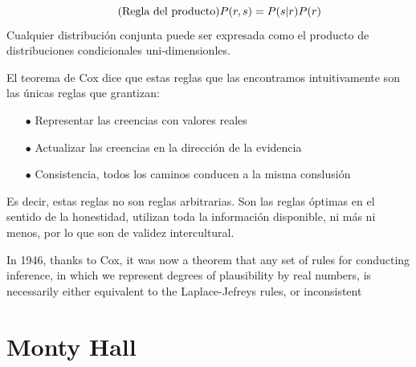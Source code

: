 \documentclass[a4paper,10pt]{book}
\begin{document}
\begin{equation}\tag{\text{Regla del producto}}
 P(r,s) = P(s|r)P(r)
\end{equation}
Cualquier distribución conjunta puede ser expresada como el producto de distribuciones condicionales uni-dimensionles.

\vspace{0.3cm}

El teorema de Cox \cite{citar biblio} dice que estas reglas que las encontramos intuitivamente son las únicas reglas que grantizan:
\begin{itemize} \setlength\itemsep{0cm}
 \item[$\bullet$] Representar las creencias con valores reales 
 \item[$\bullet$] Actualizar las creencias en la direcci\'on de la evidencia
 \item[$\bullet$] Consistencia, todos los caminos conducen a la misma conslusión
 \end{itemize}
 
Es decir, estas reglas no son reglas arbitrarias.
Son las reglas óptimas en el sentido de la honestidad, utilizan toda la información disponible, ni más ni menos, por lo que son de validez intercultural.

\vspace{0.3cm}


In 1946, thanks to Cox, it was now a theorem that any set of rules for conducting inference, in which we represent degrees of plausibility by real numbers, is necessarily either equivalent to the Laplace-Jefreys rules, or inconsistent
 
\section{Monty Hall}

\end{document}
